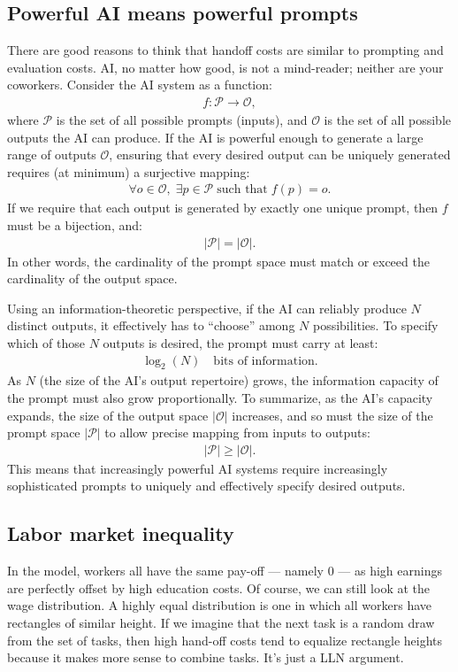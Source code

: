 \documentclass{article}
\theoremstyle{plain}
\theoremstyle{plain}
\begin{document}
\subsection{Powerful AI means powerful prompts}
There are good reasons to think that handoff costs are similar to prompting and evaluation costs.
AI, no matter how good, is not a mind-reader; neither are your coworkers.
Consider the AI system as a function:
\begin{align}
f : \mathcal{P} \longrightarrow \mathcal{O},
\end{align}
where \(\mathcal{P}\) is the set of all possible prompts (inputs), and \(\mathcal{O}\) is the set of all possible outputs the AI can produce.
If the AI is powerful enough to generate a large range of outputs \(\mathcal{O}\), ensuring that every desired output can be uniquely generated requires (at minimum) a surjective mapping:
\begin{align}
\forall o \in \mathcal{O}, \; \exists p \in \mathcal{P} \; \text{such that} \; f(p) = o.
\end{align}
If we require that each output is generated by exactly one unique prompt, then \(f\) must be a bijection, and:
\begin{align}
|\mathcal{P}| = |\mathcal{O}|.
\end{align}
In other words, the cardinality of the prompt space must match or exceed the cardinality of the output space.

Using an information-theoretic perspective, if the AI can reliably produce \(N\) distinct outputs, it effectively has to “choose” among \(N\) possibilities. 
To specify which of those \(N\) outputs is desired, the prompt must carry at least:
\begin{align}
\log_2(N) \quad \text{bits of information.}
\end{align}
As \(N\) (the size of the AI's output repertoire) grows, the information capacity of the prompt must also grow proportionally.
To summarize, as the AI’s capacity expands, the size of the output space \(|\mathcal{O}|\) increases, and so must the size of the prompt space \(|\mathcal{P}|\) to allow precise mapping from inputs to outputs:
\begin{align}
|\mathcal{P}| \geq |\mathcal{O}|.
\end{align}
This means that increasingly powerful AI systems require increasingly sophisticated prompts to uniquely and effectively specify desired outputs.

\subsection{Labor market inequality}
In the model, workers all have the same pay-off --- namely \(0\) --- as high earnings are perfectly offset by high education costs.
Of course, we can still look at the wage distribution.
A highly equal distribution is one in which all workers have rectangles of similar height.
If we imagine that the next task is a random draw from the set of tasks, then high hand-off costs tend to equalize rectangle heights because it makes more sense to combine tasks. 
It's just a LLN argument.
\end{document}
